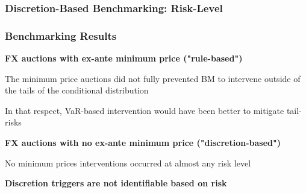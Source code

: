 \documentclass{beamer}
\newenvironment{wideitemize}{\itemize\addtolength{\itemsep}{10pt}}{\enditemize}
\newenvironment{wideenumerate}{\enumerate\addtolength{\itemsep}{10pt}}{\endenumerate}
\begin{document}
\begin{frame}
  \frametitle{Discretion-Based Benchmarking: Risk-Level}
\end{frame}



\begin{frame}
  \frametitle{Benchmarking Results}
  \begin{wideenumerate}
  \item \textbf{FX auctions with ex-ante minimum price ("rule-based")}
  \begin{wideitemize}
    \item The minimum price auctions did not fully prevented BM to intervene
      outside of the tails of the conditional distribution
    \item In that respect, VaR-based intervention would have been better to
      mitigate tail-risks
    \end{wideitemize}
\item \textbf{FX auctions with no ex-ante minimum price ("discretion-based")}
  \begin{wideitemize}
    \item No minimum prices interventions occurred at almost any risk level
    \item \textbf{Discretion triggers are not identifiable based on risk}
    \end{wideitemize}
  \end{wideenumerate}    
\end{frame}


\end{document}
